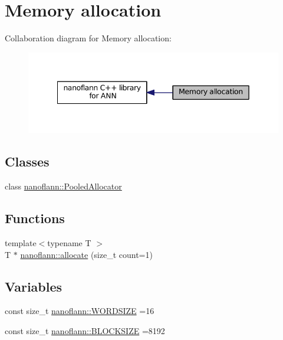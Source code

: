 \hypertarget{group__memalloc__grp}{\section{Memory allocation}
\label{group__memalloc__grp}
}
Collaboration diagram for Memory allocation\-:
\nopagebreak
\begin{figure}[H]
\begin{center}
\leavevmode
\includegraphics[width=342pt]{group__memalloc__grp}
\end{center}
\end{figure}
\subsection*{Classes}
\begin{DoxyCompactItemize}
\item 
class \hyperlink{classnanoflann_1_1_pooled_allocator}{nanoflann\-::\-Pooled\-Allocator}
\end{DoxyCompactItemize}
\subsection*{Functions}
\begin{DoxyCompactItemize}
\item 
{\footnotesize template$<$typename T $>$ }\\T $\ast$ \hyperlink{group__memalloc__grp_ga477667da2a8edb1d65f5a7eebaffc1eb}{nanoflann\-::allocate} (size\-\_\-t count=1)
\end{DoxyCompactItemize}
\subsection*{Variables}
\begin{DoxyCompactItemize}
\item 
const size\-\_\-t \hyperlink{group__memalloc__grp_ga40956ef8f797399b4f478df9fc1566f4}{nanoflann\-::\-W\-O\-R\-D\-S\-I\-Z\-E} =16
\item 
const size\-\_\-t \hyperlink{group__memalloc__grp_gaf4df087b6f47e514f6062f7ada2d19d7}{nanoflann\-::\-B\-L\-O\-C\-K\-S\-I\-Z\-E} =8192
\end{DoxyCompactItemize}



